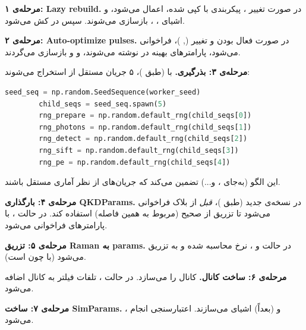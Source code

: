 \textbf{مرحله‌ی ۱: Lazy rebuild.} در صورت تغییر ، پیکربندی با  کپی شده،  اعمال می‌شود، و اشیای ، ،  بازسازی می‌شوند. سپس  در  کش می‌شود.

\textbf{مرحله‌ی ۲: Auto-optimize pulses.} در صورت فعال بودن  و تغییر (, )،  فراخوانی می‌شود، پارامترهای بهینه در  نوشته می‌شوند، و  و  بازسازی می‌گردند.

\textbf{مرحله‌ی ۳: بذرگیری.} با  (طبق )، ۵ جریان  مستقل از  استخراج می‌شوند:

\begin{LTR}
	\begin{lstlisting}[language=Python]
		seed_seq = np.random.SeedSequence(worker_seed)
		child_seqs = seed_seq.spawn(5)
		rng_prepare = np.random.default_rng(child_seqs[0])
		rng_photons = np.random.default_rng(child_seqs[1])
		rng_detect = np.random.default_rng(child_seqs[2])
		rng_sift = np.random.default_rng(child_seqs[3])
		rng_pe = np.random.default_rng(child_seqs[4])
	\end{lstlisting}
\end{LTR}

این الگو (به‌جای ،  و...) تضمین می‌کند که جریان‌های  از نظر آماری مستقل باشند.

\textbf{مرحله‌ی ۴: بارگذاری QKDParams.} در نسخه‌ی جدید (طبق )،  \emph{قبل} از بلاک  فراخوانی می‌شود تا تزریق  از  صحیح (مربوط به همین فاصله) استفاده کند. در حالت ،  با پارامترهای  فراخوانی می‌شود.

\textbf{مرحله‌ی ۵: تزریق Raman به params.} در حالت  و ، نرخ  محاسبه شده و به  تزریق می‌شود (با  چون   است).

\textbf{مرحله‌ی ۶: ساخت کانال.}  کانال را می‌سازد. در حالت ، تلفات فیلتر  به کانال اضافه می‌شود.

\textbf{مرحله‌ی ۷: ساخت SimParams.} ،  و (بعداً)  اشیای  می‌سازند. اعتبارسنجی  انجام می‌شود.

